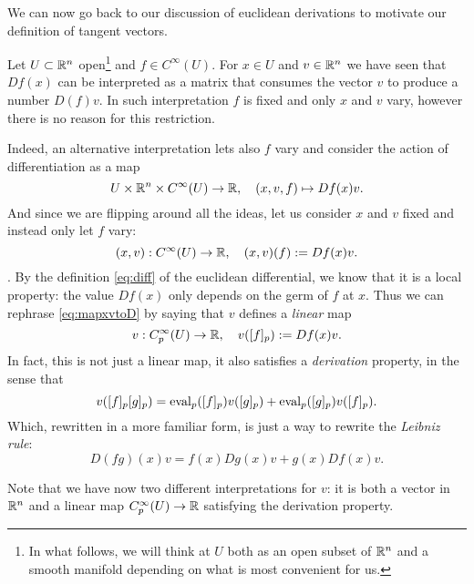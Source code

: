 We can now go back to our discussion of euclidean derivations to motivate our definition of tangent vectors.

\begin{example}\label{ex:euclideanD}
  Let $U\subset\mathbb{R}^n$ open\footnote{In what follows, we will think at $U$ both as an open subset of $\mathbb{R}^n$ and a smooth manifold depending on what is most convenient for us.} and $f\in C^\infty(U)$.
  For $x\in U$ and $v\in\mathbb{R}^n$ we have seen that $Df(x)$ can be interpreted as a matrix that consumes the vector $v$ to produce a number $D(f)v$.
  In such interpretation $f$ is fixed and only $x$ and $v$ vary, however there is no reason for this restriction.

  Indeed, an alternative interpretation lets also $f$ vary and consider the action of differentiation as a map
  \begin{equation}
    U \times \mathbb{R}^n \times C^\infty(U) \to \mathbb{R},\quad
    (x,v,f) \mapsto Df(x) v.
  \end{equation}
  And since we are flipping around all the ideas, let us consider $x$ and $v$ fixed and instead only let $f$ vary:
  \begin{equation}\label{eq:mapxvtoD}
    (x,v):C^\infty(U) \to\mathbb{R}, \quad (x,v)(f) := Df(x)v.
  \end{equation}.
  By the definition \eqref{eq:diff} of the euclidean differential, we know that it is a local property: the value $Df(x)$ only depends on the germ of $f$ at $x$.
  Thus we can rephrase \eqref{eq:mapxvtoD} by saying that $v$ defines a \emph{linear} map
  \begin{equation}
    v : C_p^\infty(U) \to \mathbb{R}, \quad
    v([f]_p) := Df(x) v.
  \end{equation}
  In fact, this is not just a linear map, it also satisfies a \emph{derivation} property, in the sense that
  \begin{equation}
    v([f]_p [g]_p) =
      \operatorname{eval}_p([f]_p)v([g]_p)
      + \operatorname{eval}_p([g]_p)v([f]_p).
  \end{equation}
  Which, rewritten in a more familiar form, is just a way to rewrite the \emph{Leibniz rule}:
  \begin{equation}
    D(fg)(x) v = f(x)Dg(x)v + g(x) Df(x)v.
  \end{equation}

  Note that we have now two different interpretations for $v$: it is both a vector in $\mathbb{R}^n$ and a linear map $C_p^\infty(U) \to \mathbb{R}$ satisfying the derivation property.
\end{example}

